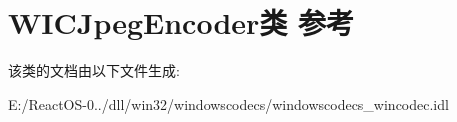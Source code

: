 \hypertarget{class_w_i_c_jpeg_encoder}{}\section{W\+I\+C\+Jpeg\+Encoder类 参考}
\label{class_w_i_c_jpeg_encoder}


该类的文档由以下文件生成\+:\begin{DoxyCompactItemize}
\item 
E\+:/\+React\+O\+S-\/0../dll/win32/windowscodecs/windowscodecs\+\_\+wincodec.\+idl\end{DoxyCompactItemize}
